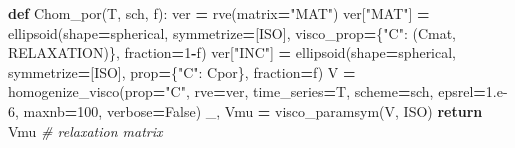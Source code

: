 \documentclass[
  a4paper,
  numbers=noendperiod,
  DIV=12]{scrreprt}
\newenvironment{Shaded}{\begin{snugshade}}{\end{snugshade}}
\newcommand{\CommentTok}[1]{\textcolor[rgb]{0.56,0.35,0.01}{\textit{#1}}}
\newcommand{\ControlFlowTok}[1]{\textcolor[rgb]{0.13,0.29,0.53}{\textbf{#1}}}
\newcommand{\DecValTok}[1]{\textcolor[rgb]{0.00,0.00,0.81}{#1}}
\newcommand{\FloatTok}[1]{\textcolor[rgb]{0.00,0.00,0.81}{#1}}
\newcommand{\KeywordTok}[1]{\textcolor[rgb]{0.13,0.29,0.53}{\textbf{#1}}}
\newcommand{\NormalTok}[1]{#1}
\newcommand{\OperatorTok}[1]{\textcolor[rgb]{0.81,0.36,0.00}{\textbf{#1}}}
\newcommand{\StringTok}[1]{\textcolor[rgb]{0.31,0.60,0.02}{#1}}
\newcommand{\VariableTok}[1]{\textcolor[rgb]{0.00,0.00,0.00}{#1}}
\begin{document}
\begin{Shaded}
\begin{Highlighting}[]
\KeywordTok{def}\NormalTok{ Chom\_por(T, sch, f):}
\NormalTok{    ver }\OperatorTok{=}\NormalTok{ rve(matrix}\OperatorTok{=}\StringTok{"MAT"}\NormalTok{)}
\NormalTok{    ver[}\StringTok{"MAT"}\NormalTok{] }\OperatorTok{=}\NormalTok{ ellipsoid(shape}\OperatorTok{=}\NormalTok{spherical, symmetrize}\OperatorTok{=}\NormalTok{[ISO],}
\NormalTok{                            visco\_prop}\OperatorTok{=}\NormalTok{\{}\StringTok{"C"}\NormalTok{: (Cmat, RELAXATION)\}, fraction}\OperatorTok{=}\DecValTok{1}\OperatorTok{{-}}\NormalTok{f)}
\NormalTok{    ver[}\StringTok{"INC"}\NormalTok{] }\OperatorTok{=}\NormalTok{ ellipsoid(shape}\OperatorTok{=}\NormalTok{spherical, symmetrize}\OperatorTok{=}\NormalTok{[ISO],}
\NormalTok{                            prop}\OperatorTok{=}\NormalTok{\{}\StringTok{"C"}\NormalTok{: Cpor\}, fraction}\OperatorTok{=}\NormalTok{f)}
\NormalTok{    V }\OperatorTok{=}\NormalTok{ homogenize\_visco(prop}\OperatorTok{=}\StringTok{"C"}\NormalTok{, rve}\OperatorTok{=}\NormalTok{ver, time\_series}\OperatorTok{=}\NormalTok{T,}
\NormalTok{                         scheme}\OperatorTok{=}\NormalTok{sch, epsrel}\OperatorTok{=}\FloatTok{1.e{-}6}\NormalTok{, maxnb}\OperatorTok{=}\DecValTok{100}\NormalTok{, verbose}\OperatorTok{=}\VariableTok{False}\NormalTok{)}
\NormalTok{    \_, Vmu }\OperatorTok{=}\NormalTok{ visco\_paramsym(V, ISO)}
    \ControlFlowTok{return}\NormalTok{ Vmu   }\CommentTok{\# relaxation matrix}
\end{Highlighting}
\end{Shaded}
\end{document}
